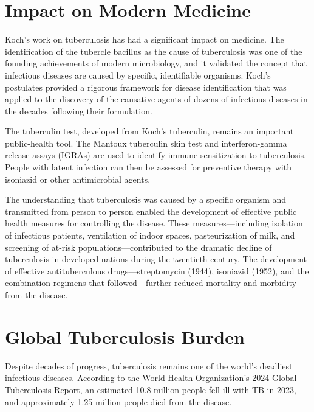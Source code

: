 \section{Impact on Modern Medicine}

Koch's work on tuberculosis has had a significant impact on medicine. The identification of the tubercle bacillus as the cause of tuberculosis was one of the founding achievements of modern microbiology, and it validated the concept that infectious diseases are caused by specific, identifiable organisms. Koch's postulates provided a rigorous framework for disease identification that was applied to the discovery of the causative agents of dozens of infectious diseases in the decades following their formulation.

The tuberculin test, developed from Koch's tuberculin, remains an important public-health tool. The Mantoux tuberculin skin test and interferon-gamma release assays (IGRAs) are used to identify immune sensitization to tuberculosis. People with latent infection can then be assessed for preventive therapy with isoniazid or other antimicrobial agents.\cite{who-tb}

The understanding that tuberculosis was caused by a specific organism and transmitted from person to person enabled the development of effective public health measures for controlling the disease. These measures---including isolation of infectious patients, ventilation of indoor spaces, pasteurization of milk, and screening of at-risk populations---contributed to the dramatic decline of tuberculosis in developed nations during the twentieth century. The development of effective antituberculous drugs---streptomycin (1944), isoniazid (1952), and the combination regimens that followed---further reduced mortality and morbidity from the disease.

\section{Global Tuberculosis Burden}

Despite decades of progress, tuberculosis remains one of the world's deadliest infectious diseases. According to the World Health Organization's 2024 Global Tuberculosis Report, an estimated 10.8 million people fell ill with TB in 2023, and approximately 1.25 million people died from the disease.\cite{who-tb}

